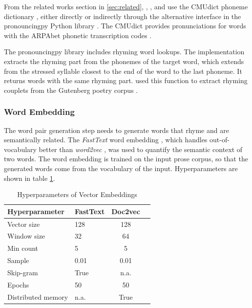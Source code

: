 \documentclass[11pt,a4paper]{article}
\begin{document}
From the related works section in \ref{sec:related}, \citet{keswarani}, \citet{cole}, and \citet{hopkins-kiela-2017} use the CMUdict phoneme dictionary \cite{cmudict}, either directly or indirectly through the alternative interface in the pronouncingpy Python library \cite{pronouncingpy}. The CMUdict provides pronunciations for words with the ARPAbet phonetic transcription codes \cite[Chapter~27]{jurafsky}.

The pronouncingpy library includes rhyming word lookups. The implementation extracts the rhyming part from the phonemes of the target word, which extends from the stressed syllable closest to the end of the word to the last phoneme. It returns words with the same rhyming part. \citet{cole} used this function to extract rhyming couplets from the Gutenberg poetry corpus \cite{gutenbergpoetry}.

\subsubsection{Word Embedding}
\label{sec:fasttext}

The word pair generation step needs to generate words that rhyme and are semantically related. The \textit{FastText} word embedding \cite{fasttext}, which handles out-of-vocabulary better than \textit{word2vec} \cite{wordvec}, was used to quantify the semantic context of two words. The word embedding is trained on the input prose corpus, so that the generated words come from the vocabulary of the input. Hyperparameters are shown in table \ref{table:HP_fasttext}.

\begin{table}[ht]
\centering
\begin{tabular}{ll c c}
	\hline\hline
	Hyperparameter & FastText & Doc2vec \\ [0.5ex]
	\hline\hline
	Vector size & 128 & 128 \\ [0.5ex]
	Window size & 32 & 64 \\ [0.5ex]
	Min count & 5 & 5 \\ [0.5ex]
	Sample & 0.01 & 0.01 \\ [0.5ex]
	Skip-gram & True & n.a. \\ [0.5ex]
	Epochs & 50 & 50 \\ [0.5ex]
	Distributed memory & n.a. & True \\ [0.5ex]
	\hline
\end{tabular}
\caption{Hyperparameters of Vector Embeddings}
\label{table:HP_fasttext}
\end{table}
\end{document}
